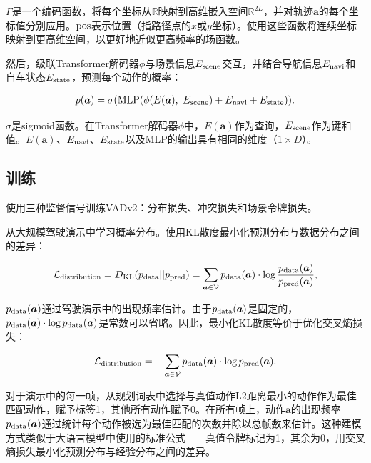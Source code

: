 \documentclass{article} %
\newcommand{\boldparagraph}[1]{\vspace{0.2cm}\noindent{\bf #1}}
\def\thename{VADv2\xspace}
\begin{document}
$\Gamma$是一个编码函数，将每个坐标从$\mathbb{R}$映射到高维嵌入空间$\mathbb{R}^{2L}$，并对轨迹$\bm{a}$的每个坐标值分别应用。$\rm pos$表示位置（指路径点的$x$或$y$坐标）。使用这些函数将连续坐标映射到更高维空间，以更好地近似更高频率的场函数。

然后，级联Transformer解码器$\phi$与场景信息$E_{\rm scene}$交互，并结合导航信息$E_{\rm navi}$和自车状态$E_{\rm state}$，预测每个动作的概率：

\begin{equation}
\begin{aligned}
    & p(\bm{a}) = \sigma({\rm MLP (\phi}(E(\bm{a}), \ E_{\rm scene}) + E_{\rm navi} +  E_{\rm state})). \\
\end{aligned}
\end{equation}

$\sigma$是sigmoid函数。在Transformer解码器$\phi$中，$E(\bm{a})$作为查询，$E_{\rm scene}$作为键和值。$E(\bm{a})$、$E_{\rm navi}$、$E_{\rm state}$以及MLP的输出具有相同的维度（$1\times D$）。


\subsection{训练}
使用三种监督信号训练\thename{}：分布损失、冲突损失和场景令牌损失。

\boldparagraph{分布损失。} 从大规模驾驶演示中学习概率分布。使用KL散度最小化预测分布与数据分布之间的差异：

\begin{equation}
\mathcal{L}_{\rm distribution} =  D_{\rm KL}(p_{\rm data} || p_{\rm pred}) = \sum_{\bm{a}\in\mathcal{V}}   p_{\rm data}(\bm{a}) \cdot \log \frac{p_{\rm data}(\bm{a})}{p_{\rm pred}(\bm{a})},
\end{equation}

$p_{\rm data}(\bm{a})$通过驾驶演示中的出现频率估计。由于$p_{\rm data}(\bm{a})$是固定的，$p_{\rm data}(\bm{a}) \cdot \log p_{\rm data}(\bm{a})$是常数可以省略。因此，最小化KL散度等价于优化交叉熵损失：

\begin{equation}
\mathcal{L}_{\rm distribution} = - \sum_{\bm{a}\in\mathcal{V}}  p_{\rm data}(\bm{a}) \cdot \log p_{\rm pred}(\bm{a}).
\label{loss_distribution}
\end{equation}

对于演示中的每一帧，从规划词表中选择与真值动作L2距离最小的动作作为最佳匹配动作，赋予标签1，其他所有动作赋予0。在所有帧上，动作$\bm{a}$的出现频率$p_{\rm data}(\bm{a})$通过统计每个动作被选为最佳匹配的次数并除以总帧数来估计。这种建模方式类似于大语言模型中使用的标准公式——真值令牌标记为1，其余为0，用交叉熵损失最小化预测分布与经验分布之间的差异。
\end{document}
